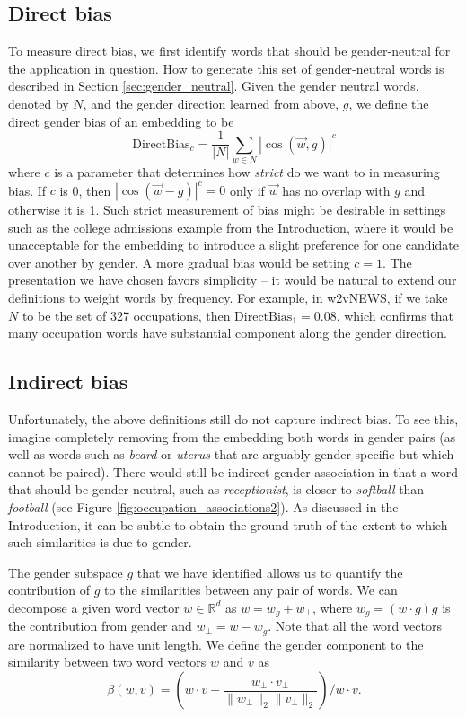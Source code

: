 \documentclass{article}
\begin{document}
\subsection{Direct bias}
To measure direct bias, we first identify words that should be gender-neutral for the application in question. How to generate this set of gender-neutral words is described in  Section \ref{sec:gender_neutral}.
Given the gender neutral words, denoted by $N$, and the gender direction learned from above, $g$, we define the direct gender bias of an embedding to be
\[
\text{DirectBias}_c = \frac{1}{|N|} \sum_{w \in N} \left|\cos(\vec{w}, g)  \right|^c
\]
where $c$ is a parameter that determines how \emph{strict} do we want to in measuring bias. If $c$ is 0, then $\left|\cos(\vec{w} - g)  \right|^c = 0$ only if $\vec{w}$ has no overlap with $g$ and otherwise it is 1. Such strict measurement of bias might be desirable in settings such as the college admissions example from the Introduction, where it would be unacceptable for the embedding to introduce a slight preference for one candidate over another by gender. A more gradual bias would be setting $c = 1$.  The presentation we have chosen favors simplicity -- it would be natural to extend our definitions to weight words by frequency. For example, in w2vNEWS, if we take $N$ to be the set of 327 occupations, then $\text{DirectBias}_1=0.08$, which confirms that many occupation words have substantial component along the gender direction. 

\subsection{Indirect bias}\label{sec:indirect}
Unfortunately, the above definitions still do not capture indirect bias. To see this, imagine completely removing from the embedding both words in gender pairs (as well as words such as {\em beard} or {\em uterus} that are arguably gender-specific but which cannot be paired). There would still be  indirect gender association in that a word that should be gender neutral, such as {\em receptionist}, is closer to {\em softball} than {\em football} (see Figure \ref{fig:occupation_associations2}). As discussed in the Introduction, it can be subtle to obtain the ground truth of the extent to which such similarities is due to gender. 

The gender subspace $g$ that we have identified allows us to quantify the contribution of $g$ to the similarities between any pair of words. We can decompose a given word vector $w \in \mathbb{R}^d$ as $w = w_g + w_{\perp}$, where $w_g = (w \cdot g) g$ is the contribution from gender and $w_{\perp} = w - w_g$. Note that all the word vectors are normalized to have unit length. We define the gender component to the similarity between two word vectors $w$ and $v$ as 
\[
\beta(w, v) = \left( w\cdot v - \frac{w_{\perp}\cdot v_{\perp}}{\|w_{\perp}\|_2 \|v_{\perp}\|_2}  \right)\bigg/w\cdot v.
\]
\end{document}
